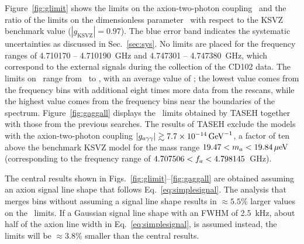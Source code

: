 
Figure~\ref{fig:glimit} shows the limits on the axion-two-photon coupling 
\gagg\ and the ratio of the limits on the dimensionless parameter \ggamma\ 
with respect to the KSVZ benchmark value ($\left|g_\text{KSVZ}\right|=0.97$).  
The blue error band indicates the systematic uncertainties as discussed in 
Sec.~\ref{sec:sys}. No limits are placed for the frequency ranges of 
4.710170 -- 4.710190~GHz and 4.747301 -- 4.747380~GHz, which correspond to 
the external signals during the collection of the CD102 data. The limits on 
\gagg\ range from \lolimit\GeVinv\ to \hilimit\GeVinv, with an average 
value of \avelimit\GeVinv; the lowest value comes from the frequency bins with 
additional eight times more data from the rescans, while the highest value 
comes from the frequency bins near the boundaries of the spectrum. 
Figure~\ref{fig:gaggall} displays the \gagg\ limits obtained by TASEH 
together with those from the previous searches. 
The results of TASEH exclude the models with the axion-two-photon
coupling $\left|g_{a\gamma\gamma}\right|\gtrsim 7.7\times 10^{-14}\,\text{Ge\hspace{-.08em}V}^{-1}$, a factor of ten above the benchmark
KSVZ model for the mass range $19.47 < m_a < 19.84 \,\mu\text{e\hspace{-.08em}V}$ (corresponding to 
the frequency range of $4.707506 < f_a < 4.798145$~GHz). 


The central results shown in Figs.~\ref{fig:glimit}--\ref{fig:gaggall} are 
obtained assuming an axion signal line shape that follows 
Eq.~\eqref{eq:simplesignal}. The analysis that merges bins without 
assuming a signal line shape %
results in $\approx5.5$\% larger values on the 
\gagg\ limits. If a Gaussian signal line shape with an FWHM of 2.5~kHz,  
about half of the axion line width in Eq.~\eqref{eq:simplesignal}, is 
assumed instead, the limits will be $\approx3.8$\% smaller than the central results. 



